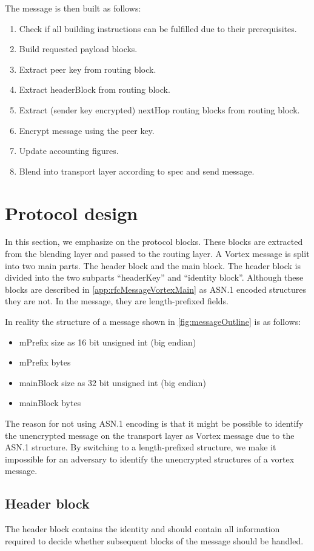 The message is then built as follows:
\begin{enumerate}
	\item Check if all building instructions can be fulfilled due to their prerequisites.
	\item Build requested payload blocks.
	\item Extract peer key from routing block.
	\item Extract headerBlock from routing block.
	\item Extract (sender key encrypted) nextHop routing blocks from routing block.
	\item Encrypt message using the peer key.
	\item Update accounting figures.
	\item Blend into transport layer according to spec and send message.
\end{enumerate}

\section{Protocol design}
In this section, we emphasize on the protocol blocks. These blocks are extracted from the blending layer and passed to the routing layer. A Vortex message is split into two main parts. The header block and the main block. The header block is divided into the two subparts ``headerKey'' and ``identity block''. Although these blocks are described in \ref{app:rfcMessageVortexMain} as ASN.1 encoded structures they are not. In the message, they are length-prefixed fields.

In reality the structure of a message shown in \ref{fig:messageOutline} is as follows:
\begin{itemize}
	\item mPrefix size as 16 bit unsigned int (big endian)
	\item mPrefix bytes
	\item mainBlock size as 32 bit unsigned int (big endian)
	\item mainBlock bytes
\end{itemize}

The reason for not using ASN.1 encoding is that it might be possible to identify the unencrypted message on the transport layer as Vortex message due to the ASN.1 structure. By switching to a length-prefixed structure, we make it impossible for an adversary to identify the unencrypted structures of a vortex message.

\subsection{Header block}
The header block contains the identity and should contain all information required to decide whether subsequent blocks of the message should be handled.

